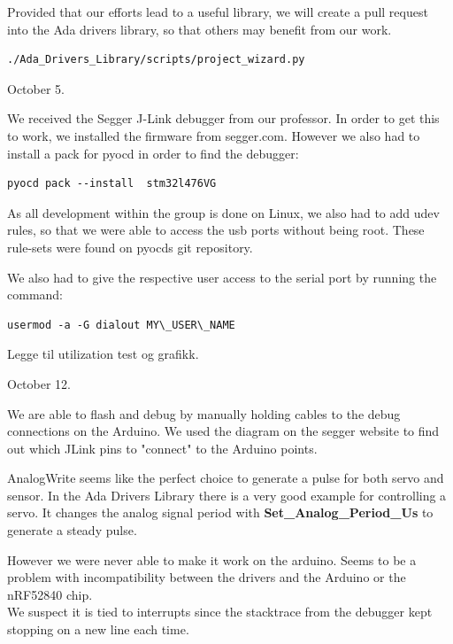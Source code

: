 \documentclass{article}
\begin{document}
Provided that our efforts lead to a useful library, we will create a pull request into the Ada drivers library, so that others may benefit from our work. 

\begin{lstlisting}
./Ada_Drivers_Library/scripts/project_wizard.py
\end{lstlisting}

\vspace{5mm}

October 5. 

We received the Segger J-Link debugger from our professor. In order to get this to work, we installed the firmware from segger.com. However we also had to install a pack for pyocd in order to find the debugger:


\begin{lstlisting}
pyocd pack --install  stm32l476VG
\end{lstlisting}

As all development within the group is done on Linux, we also had to add udev rules, so that we were able to access the usb ports without being root. These rule-sets were found on pyocds git repository.

We also had to give the respective user access to the serial port by running the command: 
\begin{lstlisting}
usermod -a -G dialout MY\_USER\_NAME
\end{lstlisting}

Legge til utilization test og grafikk.
\vspace{5mm}

October 12. 

We are able to flash and debug by manually holding cables to the debug connections on the Arduino. We used the diagram on the segger website \cite{JLINK} to find out which JLink pins to "connect" to the Arduino points.

AnalogWrite seems like the perfect choice to generate a pulse for both servo and sensor. In the Ada Drivers Library \cite{ADADRIVERSLIBRARY} there is a very good example for controlling a servo. It changes the analog signal period with \textbf{Set\_Analog\_Period\_Us} to generate a steady pulse.

However we were never able to make it work on the arduino. Seems to be a problem with incompatibility between the drivers and the Arduino or the nRF52840 chip.\\
We suspect it is tied to interrupts since the stacktrace from the debugger kept stopping on a new line each time.
\end{document}
